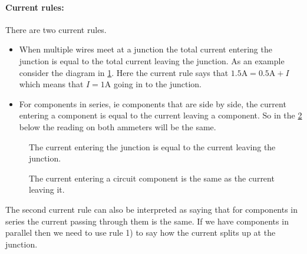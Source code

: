 \documentclass[a4paper,12pt]{book}
\begin{document}
\paragraph{Current rules:} There are two current rules.
\begin{itemize}
\setlength{\itemsep}{-5pt}
    \item[1)] When multiple wires meet at a junction the total current entering the junction is equal to the total current leaving the junction. As an example consider the diagram in \cref{fig: K1}. Here the current rule says that $1.5\text{A}=0.5\text{A}+I$ which means that $I=1\text{A}$ going in to the junction.
    \item[2)] For components in series, ie components that are side by side, the current entering a component is equal to the current leaving a component. So in the \cref{fig: K2} below the reading on both ammeters will be the same.
\end{itemize}
   \begin{figure}[ht]
    \centering
    \caption{The current entering the junction is equal to the current leaving the junction.}
    \label{fig: K1}
\end{figure}

 \begin{figure}[ht]
    \centering
    \caption{The current entering a circuit component is the same as the current leaving it.}
    \label{fig: K2}
\end{figure}

The second current rule can also be interpreted as saying that for components in series the current passing through them is the same. If we have components in parallel then we need to use rule 1) to say how the current splits up at the junction.
\end{document}
